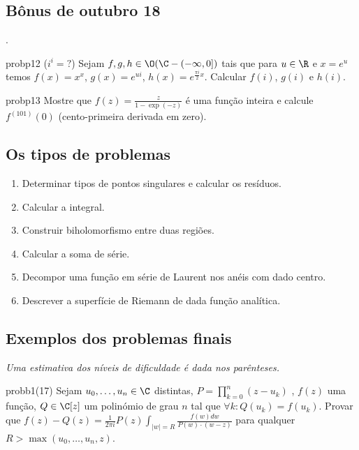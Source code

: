 \subsection{Bônus de outubro 18}.

\begin{restatable}{prob}{p12}\label{p12} ($i^i=?$)
Sejam $f,g,h \in \O(\C-(-\infty,0])$ tais que para $u\in\R$ e $x=e^u$
temos $f(x) = x^x$, $g(x) = e^{ui}$, $h(x) = e^{\frac{\pi i}{2} x}$.
Calcular $f(i)$, $g(i)$ e $h(i)$.
\end{restatable}

\begin{restatable}{prob}{p13}\label{p13}
Mostre que $f(z) = \frac{z}{1-\exp(-z)}$ é uma função inteira
e calcule $f^{(101)} (0)$ (cento-primeira derivada em zero).
\end{restatable}


\subsection{Os tipos de problemas}

\begin{enumerate}
\item Determinar tipos de pontos singulares e calcular os resíduos.
\item Calcular a integral.
\item Construir biholomorfismo entre duas regiões.
\item Calcular a soma de série.
\item Decompor uma função em série de Laurent nos anéis com dado centro.
\item Descrever a superfície de Riemann de dada função analítica.
\end{enumerate}

\subsection{Exemplos dos problemas finais}
\setcounter{prob}{0}

\emph{Uma estimativa dos níveis de dificuldade é dada nos parênteses.}

\begin{restatable}{prob}{b1}(17)
Sejam $u_0,\dots,u_n\in\C$ distintas,
$P = \prod_{k=0}^n (z-u_k)$ ,
$f(z)$ uma função, $Q \in \C[z]$ um polinómio de grau $n$ tal que
$\forall k: Q(u_k) = f(u_k)$.
Provar que
$f(z) - Q(z) = \frac{1}{2\pi i} P(z) \int_{|w|=R} \frac{f(w) dw}{P(w) \cdot (w-z)}$
para qualquer $R > \max(u_0,\dots,u_n,z)$.
\end{restatable}

